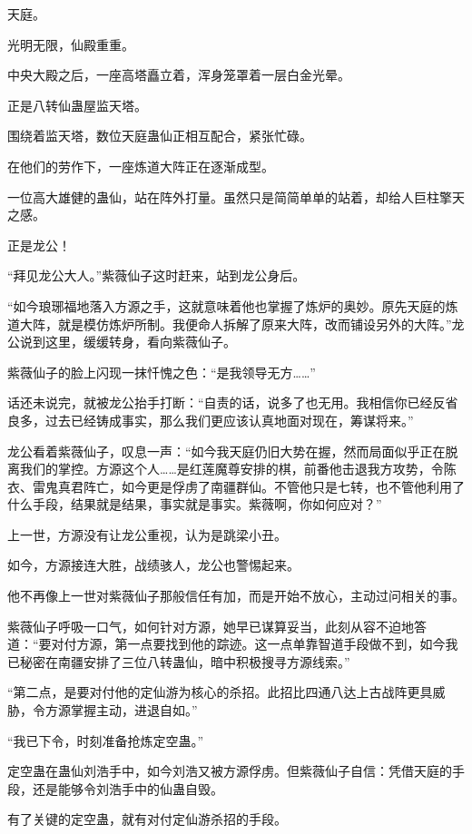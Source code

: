 
\begin{this_body}

天庭。

光明无限，仙殿重重。

中央大殿之后，一座高塔矗立着，浑身笼罩着一层白金光晕。

正是八转仙蛊屋监天塔。

围绕着监天塔，数位天庭蛊仙正相互配合，紧张忙碌。

在他们的劳作下，一座炼道大阵正在逐渐成型。

一位高大雄健的蛊仙，站在阵外打量。虽然只是简简单单的站着，却给人巨柱擎天之感。

正是龙公！

“拜见龙公大人。”紫薇仙子这时赶来，站到龙公身后。

“如今琅琊福地落入方源之手，这就意味着他也掌握了炼炉的奥妙。原先天庭的炼道大阵，就是模仿炼炉所制。我便命人拆解了原来大阵，改而铺设另外的大阵。”龙公说到这里，缓缓转身，看向紫薇仙子。

紫薇仙子的脸上闪现一抹忏愧之色：“是我领导无方……”

话还未说完，就被龙公抬手打断：“自责的话，说多了也无用。我相信你已经反省良多，过去已经铸成事实，那么我们更应该认真地面对现在，筹谋将来。”

龙公看着紫薇仙子，叹息一声：“如今我天庭仍旧大势在握，然而局面似乎正在脱离我们的掌控。方源这个人……是红莲魔尊安排的棋，前番他击退我方攻势，令陈衣、雷鬼真君阵亡，如今更是俘虏了南疆群仙。不管他只是七转，也不管他利用了什么手段，结果就是结果，事实就是事实。紫薇啊，你如何应对？”

上一世，方源没有让龙公重视，认为是跳梁小丑。

如今，方源接连大胜，战绩骇人，龙公也警惕起来。

他不再像上一世对紫薇仙子那般信任有加，而是开始不放心，主动过问相关的事。

紫薇仙子呼吸一口气，如何针对方源，她早已谋算妥当，此刻从容不迫地答道：“要对付方源，第一点要找到他的踪迹。这一点单靠智道手段做不到，如今我已秘密在南疆安排了三位八转蛊仙，暗中积极搜寻方源线索。”

“第二点，是要对付他的定仙游为核心的杀招。此招比四通八达上古战阵更具威胁，令方源掌握主动，进退自如。”

“我已下令，时刻准备抢炼定空蛊。”

定空蛊在蛊仙刘浩手中，如今刘浩又被方源俘虏。但紫薇仙子自信：凭借天庭的手段，还是能够令刘浩手中的仙蛊自毁。

有了关键的定空蛊，就有对付定仙游杀招的手段。


\end{this_body}
